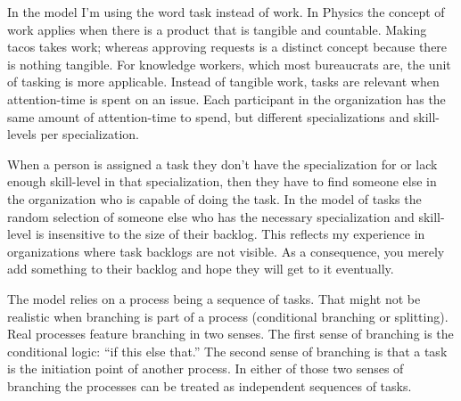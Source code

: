 In the model I'm using the word task instead of work. In Physics the concept of work applies when there is a product that is tangible and countable. Making tacos takes work; whereas approving requests is a distinct concept because there is nothing tangible. For knowledge workers, which most bureaucrats are, the unit of tasking is more applicable. Instead of tangible work, tasks are relevant when attention-time is spent on an issue.
Each participant in the organization has the same amount of attention-time to spend, but different specializations and skill-levels per specialization.


When a person is assigned a task they don't have the specialization for or lack enough skill-level in that specialization, then they have to find someone else in the organization who is capable of doing the task. 
In the model of tasks the random selection of someone else who has the necessary specialization and skill-level is insensitive to the size of their backlog. This reflects my experience in organizations where task backlogs are not visible. As a consequence, you merely add something to their backlog and hope they will get to it eventually.



The model relies on a process being a sequence of tasks. That might not be realistic when branching is part of a process (conditional branching or splitting).
Real processes feature branching in two senses. The first sense of branching is the conditional logic: ``if this else that.''
The second sense of branching is that a task is the initiation point of another process. 
In either of those two senses of branching the processes can be treated as independent sequences of tasks.



